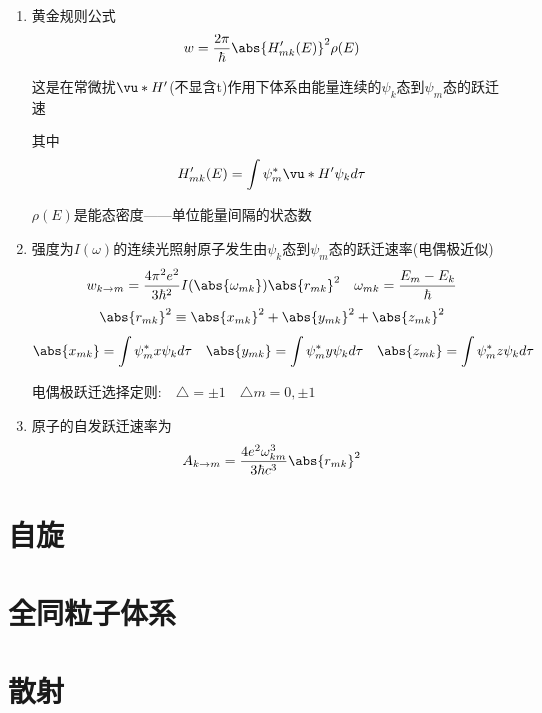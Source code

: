 \begin{formal}
\begin{enumerate}
                \item 黄金规则公式
                $$ w = \frac{2\pi}{\hbar}  \abs{H_{mk}'(E)}^{2} \rho(E) $$

                这是在常微扰$\vu*{H}'$(不显含t)作用下体系由能量连续的$\psi_{k}$态到$\psi_{m}$态的跃迁速

                其中
                $$ H_{mk}'(E) = \int \psi_{m}^{*} \vu*{H}' \psi_{k} d\tau $$

                $\rho(E)$是能态密度——单位能量间隔的状态数

                \item 强度为$I(\omega)$的连续光照射原子发生由$\psi_{k}$态到$\psi_{m}$态的跃迁速率(电偶极近似)
                $$ w_{k \rightarrow m} = \frac{4\pi^{2}e^{2}}{3\hbar^{2}} I(\abs{\omega_{mk}}) \abs{r_{mk}}^{2} \quad \omega_{mk} = \dfrac{E_{m}-E_{k}}{\hbar} $$
                $$ \abs{r_{mk}}^{2} \equiv \abs{x_{mk}}^{2} + \abs{y_{mk}}^{2} + \abs{z_{mk}}^{2} $$
                $$ \abs{x_{mk}} = \int \psi_{m}^{*}x\psi_{k} d\tau  \quad \abs{y_{mk}} = \int \psi_{m}^{*}y\psi_{k} d\tau \quad \abs{z_{mk}} = \int \psi_{m}^{*}z\psi_{k} d\tau $$
                
                电偶极跃迁选择定则:$ \quad \triangle = \pm 1 \quad \triangle m = 0,\pm 1 $

                \item 原子的自发跃迁速率为
                $$ A_{k \rightarrow m} = \frac{4e^{2}\omega_{km}^{3}}{3\hbar c^{3}} \abs{r_{mk}}^{2} $$
    

            \end{enumerate}
        \end{formal}

    \section{自旋}

    \section{全同粒子体系}

    \section{散射}
    
    


  
